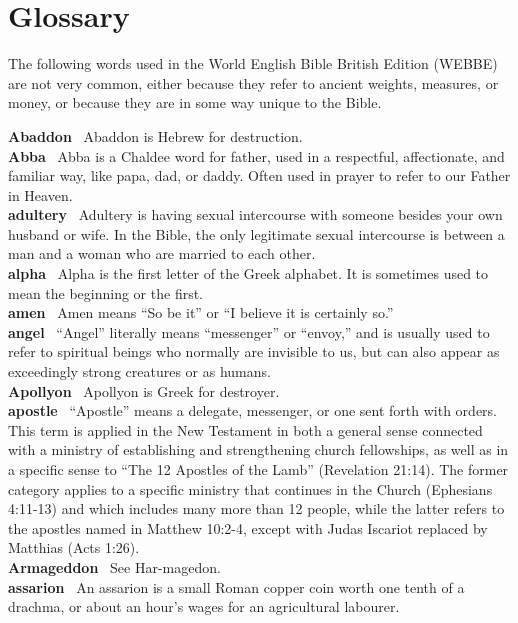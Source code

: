 \hypertarget{glossary}{%
\section{Glossary}\label{glossary}}

The following words used in the World English Bible British Edition
(WEBBE) are not very common, either because they refer to ancient
weights, measures, or money, or because they are in some way unique to
the Bible.

\textbf{Abaddon}~ Abaddon is Hebrew for destruction.\\
\textbf{Abba}~ Abba is a Chaldee word for father, used in a respectful,
affectionate, and familiar way, like papa, dad, or daddy. Often used in
prayer to refer to our Father in Heaven.\\
\textbf{adultery}~ Adultery is having sexual intercourse with someone
besides your own husband or wife. In the Bible, the only legitimate
sexual intercourse is between a man and a woman who are married to each
other.\\
\textbf{alpha}~ Alpha is the first letter of the Greek alphabet. It is
sometimes used to mean the beginning or the first.\\
\textbf{amen}~ Amen means ``So be it'' or ``I believe it is certainly
so.''\\
\textbf{angel}~ ``Angel'' literally means ``messenger'' or ``envoy,''
and is usually used to refer to spiritual beings who normally are
invisible to us, but can also appear as exceedingly strong creatures or
as humans.\\
\textbf{Apollyon}~ Apollyon is Greek for destroyer.\\
\textbf{apostle}~ ``Apostle'' means a delegate, messenger, or one sent
forth with orders. This term is applied in the New Testament in both a
general sense connected with a ministry of establishing and
strengthening church fellowships, as well as in a specific sense to
``The 12 Apostles of the Lamb'' (Revelation 21:14). The former category
applies to a specific ministry that continues in the Church (Ephesians
4:11-13) and which includes many more than 12 people, while the latter
refers to the apostles named in Matthew 10:2-4, except with Judas
Iscariot replaced by Matthias (Acts 1:26).\\
\textbf{Armageddon}~ See Har-magedon.\\
\textbf{assarion}~ An assarion is a small Roman copper coin worth one
tenth of a drachma, or about an hour's wages for an agricultural
labourer.\\
